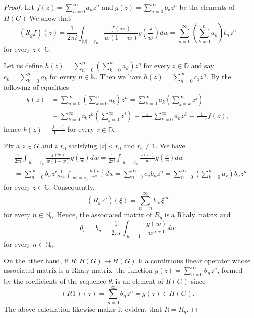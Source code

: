 \documentclass{birkjour}
\theoremstyle{definition}
\theoremstyle{remark}
\numberwithin{equation}{section}
\begin{document}
\begin{proof} Let $\displaystyle f(z)=\sum^{\infty}_{n=0} a_{n}z^{n}$ and $\displaystyle g(z)=\sum^{\infty}_{n=0}b_{n}z^{n}$ be the elements of $H(G)$ We show that
$$(R_{g}f)(z)=\frac{1}{2\pi i}\int_{|w|=r_{0}} \frac{f(w)}{w(1-w)}g\left(\frac{z}{w}\right)dw=\sum^{\infty}_{n=0}\left(\sum^{n}_{k=0}a_{k}\right)b_{n}z^{n}$$
for every $z\in \mathbb{C}$. 

Let us define
$\displaystyle h(z)=\sum^{\infty}_{n=0}\left(\sum^{n}_{k=0}a_{k}\right)z^{n}$ for every $z\in \mathbb{D}$ and say $\displaystyle c_{n}=\sum^{n}_{k=0}a_{k}$ for every $n\in \mathbb{N}$. Then we have $\displaystyle h(z)=\sum^{\infty}_{n=0}c_n z^n$. By the following of equalities
\begin{equation*}
\begin{split}
h(z)&= \sum^{\infty}_{n=0} \left(\sum^{n}_{k=0}a_{k}\right)z^{n}=\sum^{\infty}_{k=0}a_{k}\left(\sum^{\infty}_{j=k} z^{j}\right) \\
&=\sum^{\infty}_{k=0} a_{k}z^{k}\left(\sum^{\infty}_{j=0}z^{j}\right)=\frac{1}{1-z}\sum^{\infty}_{k=0}a_{k}z^{k}=\frac{1}{1-z}f(z),
\end{split}
\end{equation*}
hence $\displaystyle h(z)=\frac{f(z)}{1-z}$ for every $z\in \mathbb{D}$. 

Fix a $z\in G$ and a 
$r_{0}$ satisfying $|z|<r_{0}$ and $r_{0}\neq 1$.  We have
\begin{equation*}
\begin{split}
&\frac{1}{2\pi i}\int_{|w|=r_{0}} \frac{f(w)}{w(1-w)}g\left(\frac{z}{w}\right)dw=\frac{1}{2\pi i}\int_{|w|=r_{0}} \frac{h(w)}{w}g\left(\frac{z}{w}\right)dw \\
&= \sum^{\infty}_{n=0}b_{n}z^{n} \frac{1}{2\pi i}\int_{|w|=r_{0}} \frac{h(w)}{w^{n+1}}dw=\sum^{\infty}_{n=0}c_nb_nz^n=\sum^{\infty}_{n=0}\left(\sum^{n}_{k=0}a_{k}\right)b_{n}z^n
\end{split}
\end{equation*}
for every $z\in \mathbb{C}$. Consequently,
$$(R_{g}z^{n})(\xi)=\sum^{\infty}_{m=n}b_{m}\xi^{m}$$
for every $n\in \mathbb{N}_{0}$. Hence, the associated matrix of $R_{g}$ is a Rhaly matrix and 
$$\theta_{n}=b_{n}=\frac{1}{2\pi i} \int_{|w|=1} \frac{g(w)}{w^{n+1}}dw$$
for every $n\in \mathbb{N}_{0}$.

On the other hand, if $R:H(G)\to H(G)$ is a continuous linear operator whose associated matrix is a Rhaly matrix, the function $\displaystyle g(z)=\sum^{\infty}_{n=0}\theta_n z^n$, formed by the coefficients of the sequence $\theta$, is an element of $H(G)$ since
\begin{equation*}
(R1)(z)=\sum^{\infty}_{n=0}\theta_{n}z^{n}=g(z)\in H(G). 
\end{equation*}
The above calculation likewise makes it evident that $R=R_{g}$.
\end{proof}
\end{document}
